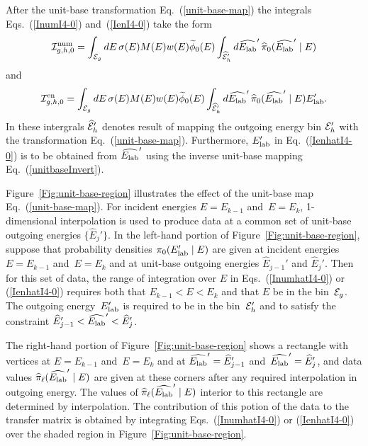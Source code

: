 After the unit-base transformation Eq.~(\ref{unit-base-map})
the integrals Eqs.~(\ref{InumI4-0}) and~(\ref{IenI4-0}) take the form
\begin{equation}
   {\cal I}^{\text{num}}_{g,h,0} =
     \int_{{\cal E}_g} dE \, \sigma ( E ) M(E) w(E) \widetilde \phi_0(E) 
   \int_{\widehat{{\cal E}}_h'} d\widehat {E_{\text{lab}}}'  \,
     \widehat\pi_0(\widehat {E_{\text{lab}}}'   \mid E)
 \label{InumhatI4-0}
\end{equation}
and
\begin{equation}
   {\cal I}^{\text{en}}_{g,h,0} =
     \int_{{\cal E}_g} dE \, \sigma ( E ) M(E) w(E) \widetilde \phi_0(E) 
   \int_{\widehat{{\cal E}}_h'} d\widehat {E_{\text{lab}}}'   \,
     \widehat\pi_0(\widehat {E_{\text{lab}}}'   \mid E) E_{\text{lab}}'  .
 \label{IenhatI4-0}
\end{equation}
In these intergrals $\widehat{{\cal E}}_h'$ denotes result of mapping the 
outgoing energy bin ${\cal E}_h'$ with the transformation Eq.~(\ref{unit-base-map}).
Furthermore, $E_{\text{lab}}'  $ in Eq.~(\ref{IenhatI4-0}) is to be obtained from $\widehat {E_{\text{lab}}}'  $
using the inverse unit-base mapping Eq.~(\ref{unitbaseInvert}).

\begin{figure}

\end{figure}

Figure~\ref{Fig:unit-base-region} illustrates the effect of
the unit-base map Eq.~(\ref{unit-base-map}).   
For incident energies $E = E_{k-1}$ and~$E = E_k$,  
1-dimensional interpolation is used
to produce data at a common set of unit-base outgoing energies
$\{\widehat E_j'\}$. In the left-hand
portion of Figure~\ref{Fig:unit-base-region}, suppose that
probability densities $\pi_0(E_{\text{lab}}'   \mid E)$ are given at incident energies
$E = E_{k-1}$ and~$E = E_k$ and at unit-base outgoing energies
 $\widehat E_{j-1}'$ and $\widehat E_j'$.  
Then for this set of data, the range of 
integration over $E$ in Eqs.~(\ref{InumhatI4-0}) or (\ref{IenhatI4-0}) requires
both that $E_{k-1} < E < E_k$ and that $E$ be in the bin~${\cal E}_g$.  The
outgoing energy~$E_{\text{lab}}'  $ is required to be in the bin~${\cal E}_h'$ and to satisfy
the constraint $\widehat E_{j-1}' < \widehat {E_{\text{lab}}}'   < \widehat E_j'$.

 The right-hand portion of Figure~\ref{Fig:unit-base-region}
shows a rectangle with vertices at $E = E_{k-1}$ and~$E = E_k$
and at $\widehat {E_{\text{lab}}}'   = \widehat E_{j-1}'$ and~$\widehat {E_{\text{lab}}}'   = \widehat E_j'$,
and data values $\widehat\pi_\ell(\widehat {E_{\text{lab}}}'   \mid E)$ are given at
these corners after any required interpolation in outgoing energy.  
The values of $\widehat\pi_\ell(\widehat {E_{\text{lab}}}'   \mid E)$
interior to this rectangle are determined by interpolation.
The contribution of this potion of the data to the transfer matrix is obtained
by integrating Eqs.~(\ref{InumhatI4-0}) or (\ref{IenhatI4-0}) over the shaded
region in Figure~\ref{Fig:unit-base-region}.

